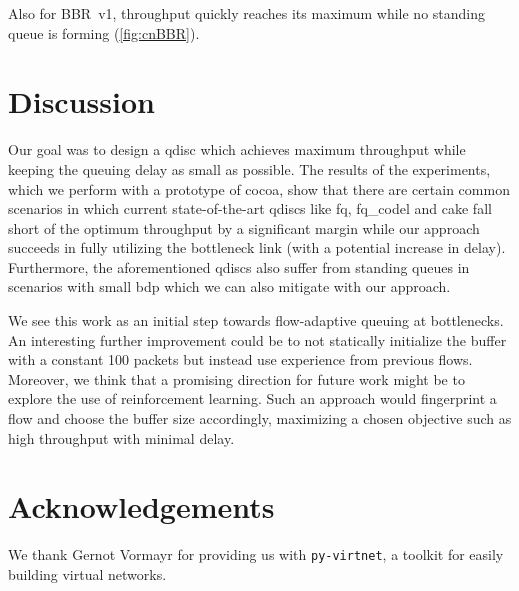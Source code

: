 \documentclass[10pt,sigconf,letterpaper,dvipsnames\ifx\removeHeaders\tempYes ,nonacm\fi]{acmart}
\begin{document}
Also for BBR~v1, throughput quickly reaches its maximum while no standing queue is forming (\autoref{fig:cnBBR}). 

\section{Discussion}

Our goal was to design a \gls{qdisc} which achieves maximum throughput while keeping the queuing delay as small as possible. The results of the experiments, which we perform with a prototype of \gls{cocoa}, show that there are certain common scenarios in which current state-of-the-art \glspl{qdisc} like fq, fq\_codel and cake fall short of the optimum throughput by a significant margin while our approach succeeds in fully utilizing the bottleneck link (with a potential increase in delay). Furthermore, the aforementioned \glspl{qdisc} also suffer from standing queues in scenarios with small \gls{bdp} which we can also mitigate with our approach. 

We see this work as an initial step towards flow-adaptive queuing at bottlenecks. An interesting further improvement could be to not statically initialize the buffer with a constant 100 packets but instead use experience from previous flows. Moreover, we think that a promising direction for future work might be to explore the use of reinforcement learning. Such an approach would fingerprint a flow and choose the buffer size accordingly, maximizing a chosen objective such as high throughput with minimal delay. 

\section*{Acknowledgements}
We thank Gernot Vormayr for providing us with \texttt{py-virtnet}, a toolkit for easily building virtual networks. 



\end{document}
